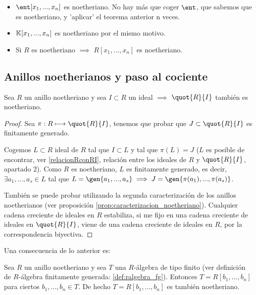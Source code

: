 \begin{example}
	\begin{itemize}
	\item $\ent[x_1,...,x_n]$ es noetheriano. No hay más que coger $\ent$, que sabemos que es noetheriano, y 'aplicar' el teorema anterior n veces.
	\item $\mathbb{K}[x_1,...,x_n]$ es noetheriano por el mismo motivo.
	\item Si $R$ es noetheriano $\implies$ $R[x_1,...,x_n]$ es noetheriano.
	\end{itemize}
\end{example}

\subsection{Anillos noetherianos y paso al cociente}

\begin{prop} \label{prop:NoetherianoCociente}
	Sea $R$ un anillo noetheriano y sea $I \subset R$ un ideal $\implies$ $\quot{R}{I}$ también es noetheriano.
\end{prop}
\begin{proof}
	Sea $\pi: R \longmapsto \quot{R}{I}$, tenemos que probar que $J \subset \quot{R}{I}$ es finitamente generado.

	Cogemos $L \subset R$ ideal de $R$ tal que $I \subset L$ y tal que $\pi(L)=J$ ($L$ es posible de encontrar, ver \ref{relacionRconRI}, relación entre los ideales de $R$ y $\quot{R}{I}$, apartado 2). Como $R$ es noetheriano, $L$ es finitamente generado, es decir, $\exists a_1,...,a_s \in L$ tal que $L=\gen{a_1,...,a_s} \implies J=\gen{\pi(a_1),...,\pi(a_s)}$.

	También se puede probar utilizando la segunda caracterización de los anillos noetherianos (ver proposición \ref{prop:caracterizacion_noetheriano}). Cualquier cadena creciente de ideales en $R$ estabiliza, si me fijo en una cadena creciente de ideales en $\quot{R}{I}$, viene de una cadena creciente de ideales en $R$, por la correspondencia biyectiva.
\end{proof}

Una consecuencia de lo anterior es:

\obs Sea $R$ un anillo noetheriano y sea $T$ una $R$-álgebra de tipo finito (ver definición de $R$-álgebra finitamente generada: \ref{def:ralgebra_fg}). Entonces $T=R[b_1,...,b_n]$ para ciertos $b_1,...,b_n \in T$. De hecho $T=R[b_1,...,b_n]$ es también noetheriano.

